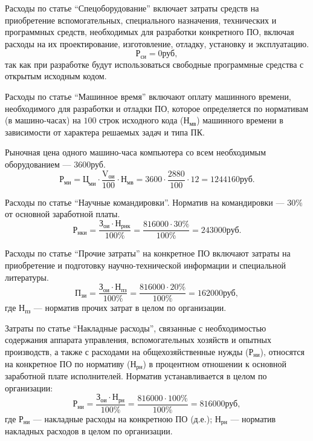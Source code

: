 Расходы по статье ``Спецоборудование'' включает затраты средств на приобретение вспомогательных, специального назначения, технических и программных средств, необходимых для разработки конкретного ПО, включая расходы на их проектирование, изготовление, отладку, установку и эксплуатацию.
\begin{displaymath}
  \text{Р}_{\text{си}} = 0 \text{руб},
\end{displaymath}
так как при разработке будут использоваться свободные программные средства с открытым исходным кодом.

Расходы по статье ``Машинное время'' включают оплату машинного времени, необходимого для разработки и отладки ПО, которое определяется по нормативам (в машино-часах) на \( 100 \) строк исходного кода (\( \text{Н}_{\text{мв}} \)) машинного времени в зависимости от характера решаемых задач и типа ПК.

Рыночная цена одного машино-часа компьютера со всем необходимым оборудованием --- \( 3600 \text{руб} \).
\begin{displaymath}
  \text{Р}_{\text{ми}} = \text{Ц}_{\text{ми}} \cdot \frac{\text{V}_{\text{ои}}}{100} \cdot \text{Н}_{\text{мв}} = 3600 \cdot \frac{2880}{100} \cdot 12 = 1244160 \text{руб}.
\end{displaymath}

Расходы по статье ``Научные командировки''. Норматив на командировки --- \( 30\% \) от основной заработной платы.
\begin{displaymath}
  \text{Р}_{\text{нки}} = \frac{\text{З}_{\text{ои}} \cdot \text{Н}_{\text{рнк}}}{100\%} = \frac{816000 \cdot 30\%}{100\%} = 243000 \text{руб}.
\end{displaymath}

Расходы по статье ``Прочие затраты'' на конкретное ПО включают затраты на приобретение и подготовку научно-технической информации и специальной литературы.
\begin{displaymath}
  \text{П}_{\text{зи}} = \frac{\text{З}_{\text{ои}} \cdot \text{Н}_{\text{пз}}}{100\%} = \frac{816000 \cdot 20\%}{100\%} = 162000 \text{руб},
\end{displaymath}
где \( \text{Н}_{\text{пз}} \) --- норматив прочих затрат в целом по организации.

Затраты по статье ``Накладные расходы'', связанные с необходимостью содержания аппарата управления, вспомогательных хозяйств и опытных производств, а также с расходами на общехозяйственные нужды (\( \text{Р}_{\text{ни}} \)), относятся на конкретное ПО по нормативу (\( \text{Н}_{\text{рн}} \)) в процентном отношении к основной заработной плате исполнителей. Норматив устанавливается в целом по организации:
\begin{displaymath}
  \text{Р}_{\text{ни}} = \frac{\text{З}_{\text{ои}} \cdot \text{Н}_{\text{рн}}}{100\%} = \frac{816000 \cdot 100\%}{100\%} = 816000 \text{руб},
\end{displaymath}
где \( \text{Р}_{\text{ни}} \) --- накладные расходы на конкретною ПО (д.е.); \( \text{Н}_{\text{рн}} \) --- норматив накладных расходов в целом по организации.

